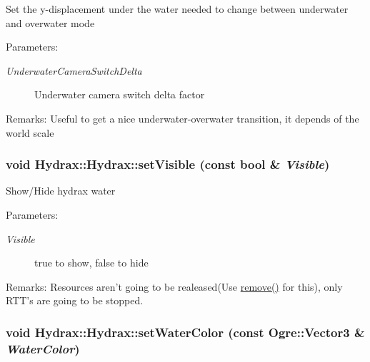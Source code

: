 Set the y-displacement under the water needed to change between underwater and overwater mode \begin{Desc}
\item[Parameters:]
\begin{description}
\item[{\em UnderwaterCameraSwitchDelta}]Underwater camera switch delta factor \end{description}
\end{Desc}
\begin{Desc}
\item[Remarks:]Useful to get a nice underwater-overwater transition, it depends of the world scale \end{Desc}
\hypertarget{class_hydrax_1_1_hydrax_2c6e89c89098c1ae2f152b0cac0ecfde}{
\subsubsection[{setVisible}]{\setlength{\rightskip}{0pt plus 5cm}void Hydrax::Hydrax::setVisible (const bool \& {\em Visible})}}
\label{class_hydrax_1_1_hydrax_2c6e89c89098c1ae2f152b0cac0ecfde}


Show/Hide hydrax water \begin{Desc}
\item[Parameters:]
\begin{description}
\item[{\em Visible}]true to show, false to hide \end{description}
\end{Desc}
\begin{Desc}
\item[Remarks:]Resources aren't going to be realeased(Use \hyperlink{class_hydrax_1_1_hydrax_02c9bf8f5576332fc836b4929e738529}{remove()} for this), only RTT's are going to be stopped. \end{Desc}
\hypertarget{class_hydrax_1_1_hydrax_e931996f1e97b983a4e3ea57a30a8d47}{
\subsubsection[{setWaterColor}]{\setlength{\rightskip}{0pt plus 5cm}void Hydrax::Hydrax::setWaterColor (const Ogre::Vector3 \& {\em WaterColor})}}
\label{class_hydrax_1_1_hydrax_e931996f1e97b983a4e3ea57a30a8d47}


